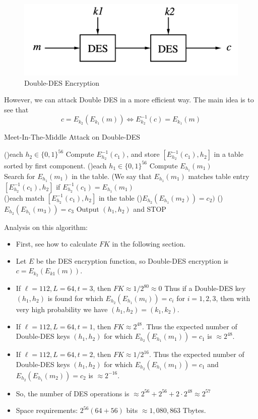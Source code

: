 \documentclass[12pt,titlepage]{article}
\begin{document}
\begin{center}
	\begin{figure}[h!]
		\includegraphics[width=\textwidth]{Double_DES.png}
		\caption{Double-DES Encryption}
	\end{figure}
\end{center}

However, we can attack Double DES in a more efficient way. The main idea is to see that $$c = E_{k_2} (E_{k_1} (m)) \Leftrightarrow E_{k_2}^{-1} (c) = E_{k_1} (m)$$
\newpage
\begin{algorithm}
	\caption{Meet-In-The-Middle Attack on Double-DES}
	\For(){each $h_2 \in \{0,1\}^{56}$}{
		Compute $E_{h_2}^{-1} (c_1)$, and store $[E_{h_2}^{-1}(c_1), h_2]$ in a table sorted by first component.
	}
	\For(){each $h_1 \in \{0,1\}^{56}$}{
		Compute $E_{h_1} (m_1)$\\
		Search for $E_{h_1} (m_1)$ in the table. (We say that $E_{h_1} (m_1)$ matches table entry $[E_{h_2}^{-1}(c_1), h_2]$ if $E_{h_2}^{-1}(c_1) = E_{h_1}(m_1)$\\
		\For(){each match $[E_{h_2}^{-1}(c_1), h_2]$ in the table}{
			\If(){$E_{h_2}(E_{h_1}(m_2)) = c_2)$}{
				\If(){$E_{h_2}(E_{h_1}(m_3)) = c_3$}{
					Output $(h_1, h_2)$ and STOP
				}
			}
		}
	}
\end{algorithm}

Analysis on this algorithm: \begin{itemize}
\item First, see how to calculate $FK$ in the following section. 
\item Let $E$ be the DES encryption function, so Double-DES encryption is $c = E_{k_2} (E_{k1} (m))$.
\item If $\ell = 112, L = 64, t=3$, then $FK \approx 1/2^{80} \approx 0$
Thus if a Double-DES key $(h_1 , h_2)$ is found for which $E_{h_2}(E_{h_1}(m_i)) = c_i$ for $i = 1, 2, 3$, then with very high probability we have $(h_1 , h_2 ) = (k_1 , k_2)$.
\item If $\ell = 112, L = 64, t=1$, then $FK \approx 2^{48}$. Thus the expected number of Double-DES keys $(h_1 , h_2 )$ for which $E_{h_2}(E_{h_1}(m_1)) = c_1$ is $\approx 2^{48}$.
\item If $\ell = 112, L = 64, t=2$, then $FK \approx 1/2^{16}$. Thus the expected number of Double-DES keys $(h_1 , h_2 )$ for which $E_{h_2}(E_{h_1}(m_1)) = c_1$ and $E_{h_2}(E_{h_1}(m_2)) = c_2$ is $\approx 2^{-16}$.
\item So, the number of DES operations is $\approx 2^{56} + 2^{56} + 2 \cdot 2^{48} \approx 2^{57}$
\item Space requirements: $2^{56} (64 + 56)$ bits $\approx 1,080,863 $ Tbytes.
\end{itemize}
\end{document}

